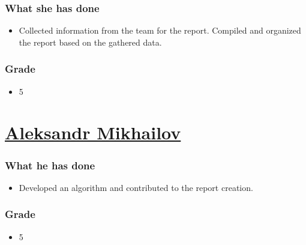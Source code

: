 \documentclass{article}
\begin{document}
\subsubsection*{What she has done}
\begin{itemize}
    \item Collected information from the team for the report. Compiled and organized the report based on the gathered data.
\end{itemize}
\subsubsection*{Grade}
\begin{itemize}
    \item 5
\end{itemize}

\section{\href{mailto:al.mikhailov@innopolis.university}{Aleksandr Mikhailov}}
\subsubsection*{What he has done}
\begin{itemize}
    \item Developed an algorithm and contributed to the report creation.
\end{itemize}

\subsubsection*{Grade}
\begin{itemize}
    \item 5
\end{itemize}
\end{document}
